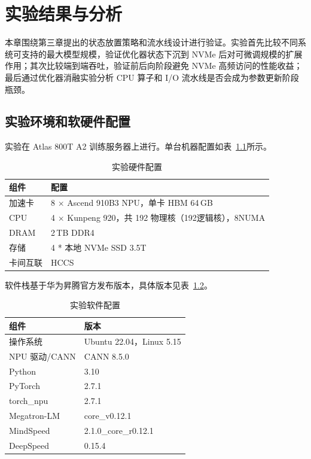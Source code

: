 \documentclass[bachelor,openany,oneside,color,AutoFakeBold=true]{buaathesis}
\begin{document}
\chapter{实验结果与分析}
本章围绕第三章提出的状态放置策略和流水线设计进行验证。实验首先比较不同系统可支持的最大模型规模，验证优化器状态下沉到 NVMe 后对可微调规模的扩展作用；其次比较端到端吞吐，验证前后向阶段避免 NVMe 高频访问的性能收益；最后通过优化器消融实验分析 CPU 算子和 I/O 流水线是否会成为参数更新阶段瓶颈。


\section{实验环境和软硬件配置}

实验在 Atlas 800T A2 训练服务器上进行。单台机器配置如表~\ref{tab:hw}所示。

\begin{table}[!htbp]
  \centering
  \caption{实验硬件配置}
  \label{tab:hw}
  \begin{tabular}{ll}
    \toprule
    组件 & 配置 \\
    \midrule
    加速卡 & 8 $\times$ Ascend 910B3 NPU，单卡 HBM 64\,GB \\
    CPU    & 4 $\times$ Kunpeng 920，共 192 物理核（192逻辑核），8NUMA \\
    DRAM   & 2\,TB DDR4 \\
    存储   & 4 * 本地 NVMe SSD 3.5T \\
    卡间互联 & HCCS \\
    \bottomrule
  \end{tabular}
\end{table}

软件栈基于华为昇腾官方发布版本，具体版本见表~\ref{tab:sw}。

\begin{table}[!htbp]
  \centering
  \caption{实验软件配置}
  \label{tab:sw}
  \begin{tabular}{ll}
    \toprule
    组件 & 版本 \\
    \midrule
    操作系统         & Ubuntu 22.04，Linux 5.15 \\
    NPU 驱动/CANN    & CANN 8.5.0 \\
    Python           & 3.10 \\
    PyTorch          & 2.7.1 \\
    torch\_npu       & 2.7.1 \\
    Megatron-LM      & core\_v0.12.1 \\
    MindSpeed        & 2.1.0\_core\_r0.12.1 \\
    DeepSpeed        & 0.15.4 \\
    \bottomrule
  \end{tabular}
\end{table}
\end{document}
